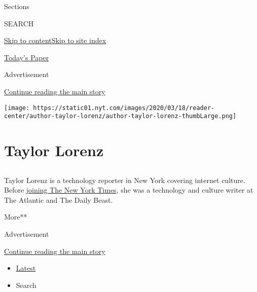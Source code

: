 Sections

SEARCH

\protect\hyperlink{site-content}{Skip to
content}\protect\hyperlink{site-index}{Skip to site index}

\href{https://myaccount.nytimes.com/auth/login?response_type=cookie\&client_id=vi}{}

\href{https://www.nytimes.com/section/todayspaper}{Today's Paper}

Advertisement

\protect\hyperlink{after-top}{Continue reading the main story}

\texttt{[image: https://static01.nyt.com/images/2020/03/18/reader-center/author-taylor-lorenz/author-taylor-lorenz-thumbLarge.png]}

\hypertarget{taylor-lorenz}{%
\section{Taylor Lorenz}\label{taylor-lorenz}}

\subsection{}

Taylor Lorenz is a technology reporter in New York covering internet
culture. Before
\href{https://www.nytco.com/press/taylor-lorenz-to-join-styles/}{joining
The New York Times}, she was a technology and culture writer at The
Atlantic and The Daily Beast.

More**

Advertisement

\protect\hyperlink{after-mid1}{Continue reading the main story}

\begin{itemize}
\tightlist
\item
  \protect\hyperlink{stream-panel}{Latest}
\item
  Search
\end{itemize}

